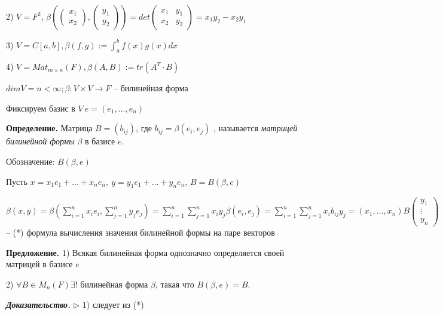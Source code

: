 2) $V = F^2$, $\beta \left(\begin{pmatrix} x_1 \\ x_2 \end{pmatrix}, \begin{pmatrix} y_1 \\ y_2 \end{pmatrix} \right) = det \begin{pmatrix} x_1 & y_1 \\ x_2 & y_2 \end{pmatrix} = x_1 y_2 - x_2 y_1$

3) $V = C[a, b], \beta(f, g):= \int_a^b f(x) g(x) dx$

4) $V = Mat_{m \times n} (F), \beta (A, B) := tr(A^T \cdot B)$

\vspace{\baselineskip}
$dimV = n < \infty; \beta: V \times V \rightarrow F$ -- билинейная форма

Фиксируем базис в $V \ e = (e_1, \dots, e_n)$

\vspace{\baselineskip}
\textbf{Определение.} Матрица $B = (b_{ij})$, где $b_{ij} = \beta(e_i, e_j)$ , называется \textit{матрицей билинейной формы} $\beta$ в базисе $e$.

Обозначение: $B(\beta, e)$

\vspace{\baselineskip}
Пусть $x = x_1e_1 + \dots + x_n e_n, \ y = y_1 e_1 + \dots + y_n e_n$, $B = B(\beta, e)$

\vspace{\baselineskip}
$\beta(x, y) = \beta(\sum\limits_{i=1}^n x_i e_i, \sum\limits_{j=1}^n y_j e_j) = \sum\limits_{i=1}^n \sum\limits_{j=1}^n x_i y_j \beta(e_i, e_j) = \sum\limits_{i=1}^n \sum\limits_{j=1}^n x_i b_{ij} y_j = (x_1, \dots, x_n) B \begin{pmatrix} y_1 \\ \vdots \\ y_n \end{pmatrix}$ -- (*) формула вычисления значения билинейной формы на паре векторов

\vspace{\baselineskip}
\textbf{Предложение.} 1) Всякая билинейная форма однозначно определяется своей матрицей в базисе $e$

2) $\forall B \in M_n (F) \exists !$ билинейная форма $\beta$, такая что $B(\beta, e) = B$.

\vspace{\baselineskip}
\textbf{\textit{Доказательство.}} $\rhd$ 1) следует из (*)

